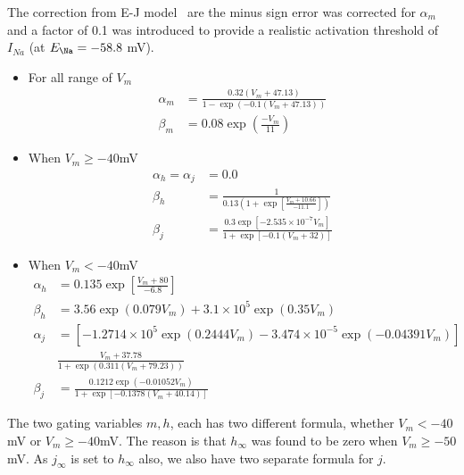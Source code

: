 \begin{enumerate}
  The correction from E-J model~\citep{ebihara1980fsc} are the minus
  sign error was corrected for $\alpha_m$ and a factor of 0.1 was
  introduced to provide a realistic activation threshold of $I_{Na}$
  (at $E_\Na=-58.8$ mV).
  \begin{itemize}
  \item For all range of $V_m$
    \begin{equation}
      \label{eq:743}
      \begin{split}
        \alpha_m &= \frac{0.32(V_m+47.13)}{1-\exp(-0.1(V_m+47.13))} \\
        \beta_m &= 0.08\exp(\frac{-V_m}{11})
      \end{split}
    \end{equation}
  \item When $V_m\ge -40$mV
    \begin{equation}
      \label{eq:741}
      \begin{split}
        \alpha_h = \alpha_j &= 0.0 \\
        \beta_h &= \frac{1}{0.13(1+\exp[\frac{V_m+10.66}{-11.1}])} \\
        \beta_j &= \frac{0.3\exp[-2.535\times 10^{-7}V_m]}{1+\exp[-0.1(V_m+32)]}
      \end{split}
    \end{equation}
  \item When $V_m < -40$mV
    \begin{equation}
      \label{eq:742}
      \begin{split}
        \alpha_h &= 0.135\exp[\frac{V_m+80}{-6.8}] \\
        \beta_h &= 3.56\exp(0.079V_m) + 3.1 \times 10^5 \exp(0.35V_m) \\
        \alpha_j &= [-1.2714\times 10^5 \exp(0.2444V_m) - 3.474\times
        10^{-5}\exp(-0.04391V_m)] \\
        &\frac{V_m+37.78}{1+\exp(0.311(V_m+79.23))} \\
        \beta_j &= \frac{0.1212\exp(-0.01052V_m)}{1+\exp[-0.1378(V_m+40.14)]}
      \end{split}
    \end{equation}
  \end{itemize}
  The two gating variables $m,h$, each has two different formula,
  whether $V_m<-40$mV or $V_m\ge-40$mV. The reason is that $h_\infty$
  was found to be zero when $V_m\ge-50$mV. As $j_\infty$ is set to
  $h_\infty$ also, we also have two separate formula for
  $j$. 


\end{enumerate}
